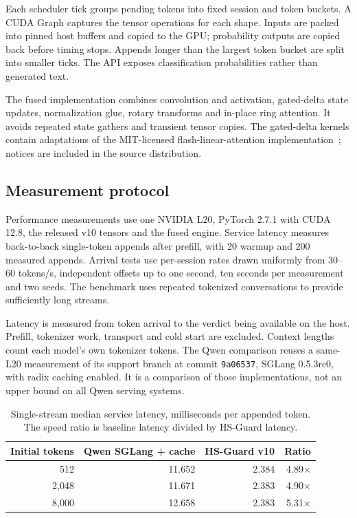 \documentclass[11pt]{article}
\begin{document}
Each scheduler tick groups pending tokens into fixed session and token buckets. A CUDA Graph captures the tensor operations for each shape. Inputs are packed into pinned host buffers and copied to the GPU; probability outputs are copied back before timing stops. Appends longer than the largest token bucket are split into smaller ticks. The API exposes classification probabilities rather than generated text.

The fused implementation combines convolution and activation, gated-delta state updates, normalization glue, rotary transforms and in-place ring attention. It avoids repeated state gathers and transient tensor copies. The gated-delta kernels contain adaptations of the MIT-licensed flash-linear-attention implementation~\cite{fla}; notices are included in the source distribution.

\subsection{Measurement protocol}
Performance measurements use one NVIDIA L20, PyTorch 2.7.1 with CUDA 12.8, the released v10 tensors and the fused engine. Service latency measures back-to-back single-token appends after prefill, with 20 warmup and 200 measured appends. Arrival tests use per-session rates drawn uniformly from 30--60 tokens/s, independent offsets up to one second, ten seconds per measurement and two seeds. The benchmark uses repeated tokenized conversations to provide sufficiently long streams.

Latency is measured from token arrival to the verdict being available on the host. Prefill, tokenizer work, transport and cold start are excluded. Context lengths count each model's own tokenizer tokens. The Qwen comparison reuses a same-L20 measurement of its support branch at commit \texttt{9a06537}, SGLang 0.5.3rc0, with radix caching enabled. It is a comparison of those implementations, not an upper bound on all Qwen serving systems.

\begin{table}[h]
\centering
\caption{Single-stream median service latency, milliseconds per appended token. The speed ratio is baseline latency divided by HS-Guard latency.}
\begin{tabular}{rrrr}\toprule
Initial tokens & Qwen SGLang + cache & HS-Guard v10 & Ratio\\\midrule
512 & 11.652 & 2.384 & 4.89$\times$\\
2,048 & 11.671 & 2.383 & 4.90$\times$\\
8,000 & 12.658 & 2.383 & 5.31$\times$\\\bottomrule
\end{tabular}
\end{table}
\end{document}
